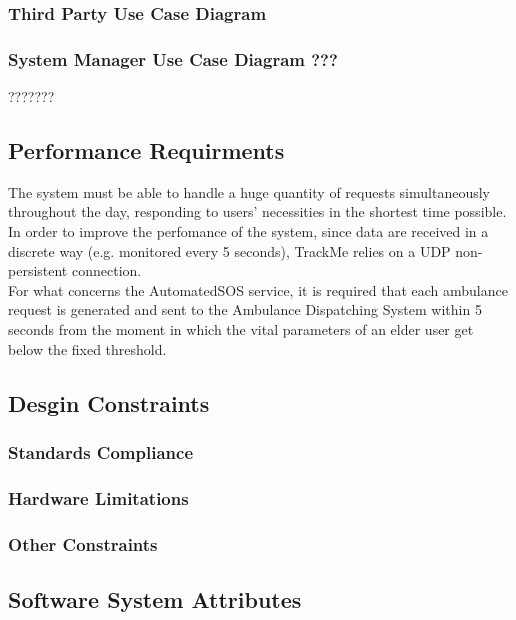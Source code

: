 \documentclass[12pt,a4paper]{article}
\begin{document}
		\subsubsection{Third Party Use Case Diagram}
			\begin{figure}[h]
				\centering
				\label{fig:use_case_third_party}
			\end{figure}
		
		\subsubsection{System Manager Use Case Diagram ???}
		???????
	
	\subsection{Performance Requirments}
	The system must be able to handle a huge quantity of requests simultaneously throughout the day, responding to users' necessities in the shortest time possible. In order to improve the perfomance of the system, since data are received in a discrete way (e.g. monitored every 5 seconds), TrackMe relies on a UDP non-persistent connection.\\
	For what concerns the AutomatedSOS service, it is required that each ambulance request is generated and sent to the Ambulance Dispatching System within 5 seconds from the moment in which the vital parameters of an elder user get below the fixed threshold.
	
	\subsection{Desgin Constraints}
		\subsubsection{Standards Compliance}
		\subsubsection{Hardware Limitations}
		\subsubsection{Other Constraints}
	
	\subsection{Software System Attributes}
\end{document}

